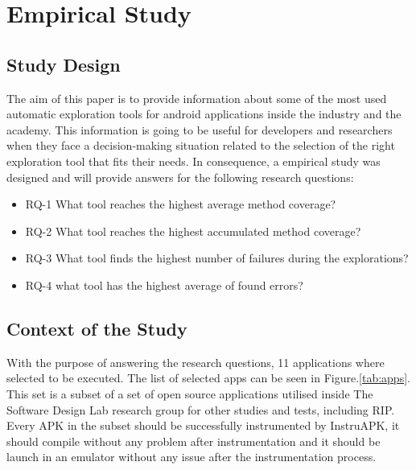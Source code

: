 
\chapter{Empirical Study} %

\label{Chapter4} %

\section{Study Design}\label{sec:studydesign}

The aim of this paper is to provide information about some of the most used automatic exploration tools for android applications inside the industry and the academy. This information is going to be useful for developers and researchers when they face a decision-making situation related to the selection of the right exploration tool that fits their needs. In consequence, a empirical study was designed and will provide answers for the following research questions: 

\begin{itemize}
\item RQ-1 What tool reaches the highest average method coverage?
\item RQ-2 What tool reaches the highest accumulated method coverage?
\item RQ-3 What tool finds the highest number of failures during the explorations?
\item RQ-4 what tool has the highest average of found errors?
\end{itemize}

\section{Context of the Study}

With the purpose of answering the research questions, 11 applications where selected to be executed. The list of selected apps can be seen in Figure.\ref{tab:apps}. This set is a subset of a set of open source applications utilised inside The Software Design Lab research group for other studies and tests, including RIP. Every APK in the subset should be successfully instrumented by InstruAPK, it should compile without any problem after instrumentation and it should be launch in an emulator without any issue after the instrumentation process.

